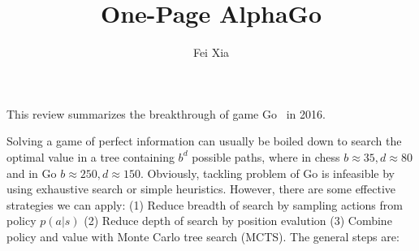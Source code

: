 \documentclass[11pt]{article}
\begin{document}
\title{One-Page AlphaGo}
\author{Fei Xia}
\date{}

\maketitle
This review summarizes the breakthrough of game Go~\cite{Silver_2016} in 2016.

Solving a game of perfect information can usually be boiled down to search the optimal value in a tree containing $b^d$ possible paths, where in chess $b\approx 35, d\approx 80$ and in Go $b\approx 250, d\approx 150$. Obviously, tackling problem of Go is infeasible by using exhaustive search or simple heuristics. However, there are some effective strategies we can apply: (1) Reduce breadth of search by sampling actions from policy $p(a|s)$ (2) Reduce depth of search by position evalution (3) Combine policy and value with Monte Carlo tree search (MCTS). The general steps are:
\end{document}
